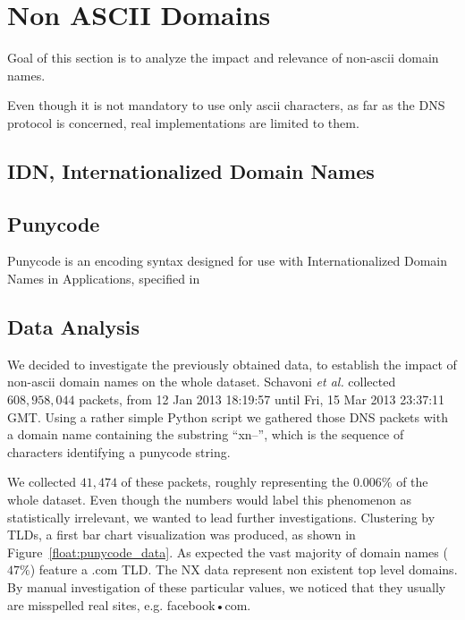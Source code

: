 \section{Non ASCII Domains}
\label{sec:non_ascii_domains}
Goal of this section is to analyze the impact and relevance of non-ascii domain names.

Even though it is not mandatory to use only ascii characters, as far as the DNS protocol is
concerned, real implementations are limited to them.


\subsection{IDN, Internationalized Domain Names} %
\label{sub:idn_internationalized_domain_names}



\subsection{Punycode} %
\label{sub:punycode}
Punycode is an encoding syntax designed for use with Internationalized Domain Names in
Applications, specified in



\subsection{Data Analysis} %
\label{sub:data_analysis}

We decided to investigate the previously obtained data, to establish the impact of non-ascii
domain names on the whole dataset. Schavoni \emph{et al.} collected $608,958,044$ packets,
from 12 Jan 2013 18:19:57 until Fri, 15 Mar 2013 23:37:11 GMT. Using a rather simple Python
script we gathered those DNS packets with a domain name containing the substring ``xn--'', which
is the sequence of characters identifying a punycode string.

We collected $41,474$ of these packets, roughly representing the $0.006\%$ of the whole dataset.
Even though the numbers would label this phenomenon as statistically irrelevant, we wanted to
lead further investigations. Clustering by TLDs, a first bar chart visualization was
produced, as shown in Figure~\ref{float:punycode_data}. As expected the vast majority of domain
names ($47\%$) feature a .com TLD. The NX data represent non existent top level domains. By
manual investigation of these particular values, we noticed that they usually are misspelled
real sites, e.g. facebook•com.




